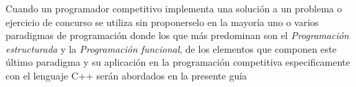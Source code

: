 Cuando un programador competitivo implementa una solución a un problema o ejercicio de concurso se utiliza sin proponerselo en la mayoría uno o varios paradigmas de programación donde los que más predominan son el \emph{Programación estructurada} y la \emph{Programación funcional}, de los elementos que componen este último paradigma y su aplicación en la programación competitiva especificamente con el lenguaje C++ serán abordados en la presente guía